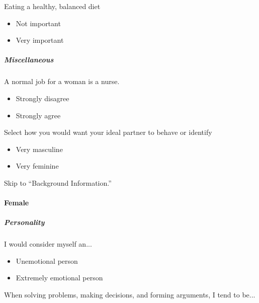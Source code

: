 \begin{multicols}{2}
 Eating a healthy, balanced diet

 \begin{itemize}
  \item
        Not important
 \end{itemize}

 \begin{itemize}
  \item
        Very important
 \end{itemize}

 \subparagraph{Miscellaneous}

 A normal job for a woman is a nurse.

 \begin{itemize}
  \item
        Strongly disagree
 \end{itemize}

 \begin{itemize}
  \item
        Strongly agree
 \end{itemize}

 Select how you would want your ideal partner to behave or identify

 \begin{itemize}
  \item
        Very masculine
 \end{itemize}

 \begin{itemize}
  \item
        Very feminine
 \end{itemize}

 Skip to ``Background Information.''

 \paragraph{Female}

 \subparagraph{Personality}

 I would consider myself an...

 \begin{itemize}
  \item
        Unemotional person
 \end{itemize}

 \begin{itemize}
  \item
        Extremely emotional person
 \end{itemize}

 When solving problems, making decisions, and forming arguments, I tend to be...


\end{multicols}
